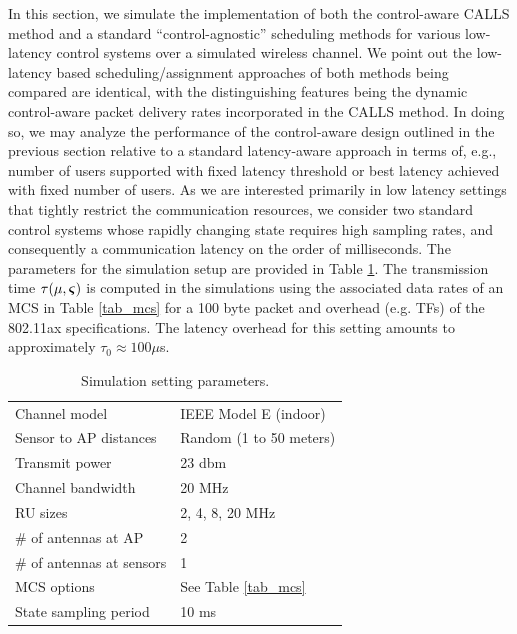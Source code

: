 In this section, we simulate the implementation of both the control-aware CALLS method and a standard ``control-agnostic'' scheduling methods for various low-latency control systems over a simulated wireless channel. We point out the low-latency based scheduling/assignment approaches of both methods being compared are identical, with the distinguishing features being the dynamic control-aware packet delivery rates incorporated in the CALLS method. In doing so, we may analyze the performance of the control-aware design outlined in the previous section relative to a standard latency-aware approach in terms of, e.g., number of users supported with fixed latency threshold or best latency achieved with fixed number of users. As we are interested primarily in low latency settings that tightly restrict the communication resources, we consider two standard control systems whose rapidly changing state requires high sampling rates, and consequently a communication latency on the order of milliseconds. The parameters for the simulation setup are provided in Table \ref{tab_simulation}.  The transmission time $\tau(\mu,\boldsymbol{\varsigma})$ is computed in the simulations using the associated data rates of an MCS in Table \ref{tab_mcs} for a 100 byte packet and overhead (e.g. TFs) of the 802.11ax specifications. The latency overhead for this setting amounts to approximately $\tau_0 \approx 100 \mu$s.
%
\begin{table}
\begin{tabular}{ l | l } \hline
  Channel model & IEEE Model E (indoor) \cite{liu2014ieee} \\
  Sensor to AP distances & Random (1 to 50 meters)\\
  Transmit power & 23 dbm \\
  Channel bandwidth & 20 MHz \\
  RU sizes & 2, 4, 8, 20 MHz \\
  \# of antennas at AP & 2 \\
  \# of antennas at sensors & 1 \\
  MCS options & See Table \ref{tab_mcs} \\
  State sampling period & 10 ms \\
  \hline
\end{tabular}
\caption{Simulation setting parameters.}
\label{tab_simulation}
\end{table}
%

